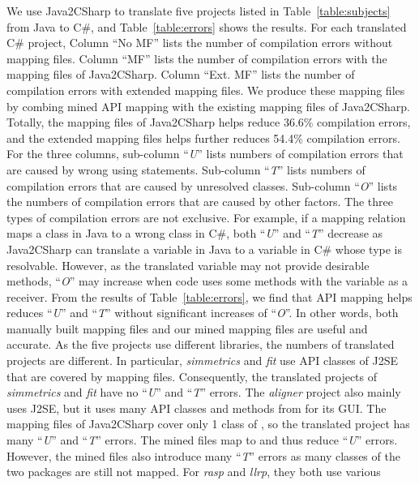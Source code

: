 We use Java2CSharp to translate five projects listed in
Table~\ref{table:subjects} from Java to C\#, and
Table~\ref{table:errors} shows the results. For each translated C\#
project, Column ``No MF'' lists the number of compilation errors
without mapping files. Column ``MF'' lists the number of compilation
errors with the mapping files of Java2CSharp. Column ``Ext. MF''
lists the number of compilation errors with extended mapping files.
We produce these mapping files by combing mined API mapping with the
existing mapping files of Java2CSharp. Totally, the mapping files of
Java2CSharp helps reduce 36.6\% compilation errors, and the extended
mapping files helps further reduces 54.4\% compilation errors. For
the three columns, sub-column ``\emph{U}'' lists numbers of
compilation errors that are caused by wrong using statements.
Sub-column ``\emph{T}'' lists numbers of compilation errors that are
caused by unresolved classes. Sub-column ``\emph{O}'' lists the
numbers of compilation errors that are caused by other factors. The
three types of compilation errors are not exclusive. For example, if
a mapping relation maps a class in Java to a wrong class in C\#,
both ``\emph{U}'' and ``\emph{T}'' decrease as Java2CSharp can
translate a variable in Java to a variable in C\# whose type is
resolvable. However, as the translated variable may not provide
desirable methods, ``\emph{O}'' may increase when code uses some
methods with the variable as a receiver. From the results of
Table~\ref{table:errors}, we find that API mapping helps reduces
``\emph{U}'' and ``\emph{T}'' without significant increases of
``\emph{O}''. In other words, both manually built mapping files and
our mined mapping files are useful and accurate. As the five
projects use different libraries, the numbers of translated projects
are different. In particular, \emph{simmetrics} and \emph{fit} use
API classes of J2SE that are covered by mapping files. Consequently,
the translated projects of \emph{simmetrics} and \emph{fit} have no
``\emph{U}'' and ``\emph{T}'' errors. The \emph{aligner} project
also mainly uses J2SE, but it uses many API classes and methods from
 for its GUI. The mapping files of Java2CSharp
cover only 1 class of , so the translated project
has many ``\emph{U}'' and ``\emph{T}'' errors. The mined files map
 to  and thus reduce
``\emph{U}'' errors. However, the mined files also introduce many
``\emph{T}'' errors as many classes of the two packages are still
not mapped. For \emph{rasp} and \emph{llrp}, they both use various
